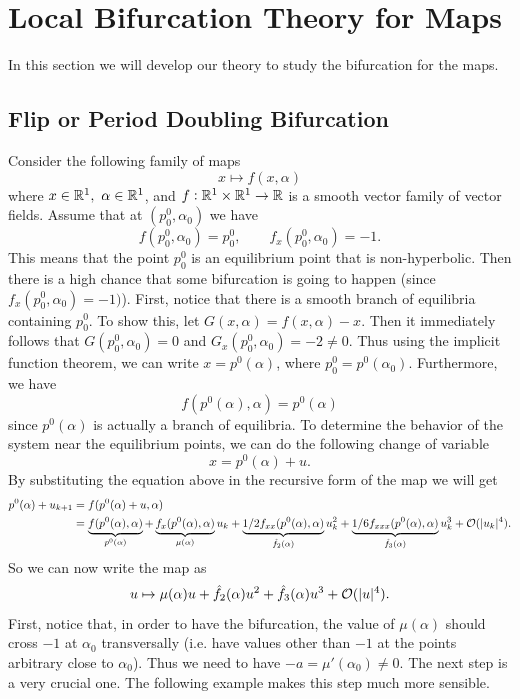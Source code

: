  
\section{Local Bifurcation Theory for Maps}
In this section we will develop our theory to study the bifurcation for the maps.

\subsection{Flip or Period Doubling Bifurcation}
Consider the following family of maps
\[ x \mapsto f(x,\alpha) \]
where $x \in \mathbb{R}^1,\ \alpha \in \mathbb{R}^1$, and $f: \mathbb{R}^1\times\mathbb{R}^1 \to \mathbb{R}$ is a smooth vector family of vector fields. Assume that at $(p^0_0, \alpha_0)$ we have
\[ f(p_0^0, \alpha_0) = p_0^0, \qquad f_x(p_0^0, \alpha_0) = -1. \]
This means that the point $p_0^0$ is an equilibrium point that is non-hyperbolic. Then there is a high chance that some bifurcation is going to happen (since $f_x(p^0_0,\alpha_0)=-1)$). First, notice that there is a smooth branch of equilibria containing $p_0^0$. To show this, let $G(x,\alpha) = f(x,\alpha) - x$. Then it immediately follows that $G(p_0^0, \alpha_0) = 0$ and $G_x(p_0^0,\alpha_0) = -2 \neq 0$. Thus using the implicit function theorem, we can write $x = p^0(\alpha)$, where $p_0^0 = p^0(\alpha_0)$. Furthermore, we have
\[ f(p^0(\alpha),\alpha) = p^0(\alpha) \]
since $p^0(\alpha)$ is actually a branch of equilibria. To determine the behavior of the system near the equilibrium points, we can do the following change of variable
\[ x = p^0(\alpha) + u. \]
By substituting the equation above in the recursive form of the map we will get
\begin{align*}
	p^0(\alpha) + u_{k+1} &= f(p^0(\alpha)+u,\alpha) \\
	&= \underbrace{f(p^0(\alpha),\alpha)}_{p^0(\alpha)} + \underbrace{f_x(p^0(\alpha),\alpha)}_{\mu(\alpha)}u_k + \underbrace{1/2f_{xx}(p^0(\alpha),\alpha)}_{\hat{f}_2(\alpha)}u_k^2 + \underbrace{1/6f_{xxx}(p^0(\alpha),\alpha)}_{\hat{f}_3(\alpha)}u_k^3 + \mathcal{O}(|u_k|^4).
\end{align*}
So we can now write the map as
\[ u \mapsto \mu(\alpha)u + \hat{f}_2(\alpha)u^2 + \hat{f}_3(\alpha)u^3 + \mathcal{O}(|u|^4). \]
First, notice that, in order to have the bifurcation, the value of $\mu(\alpha)$ should cross $-1$ at $\alpha_0$ transversally (i.e. have values other than $-1$ at the points arbitrary close to $\alpha_0$). Thus we need to have $-a = \mu'(\alpha_0) \neq 0$. The next step is a very crucial one. The following example makes this step much more sensible.

